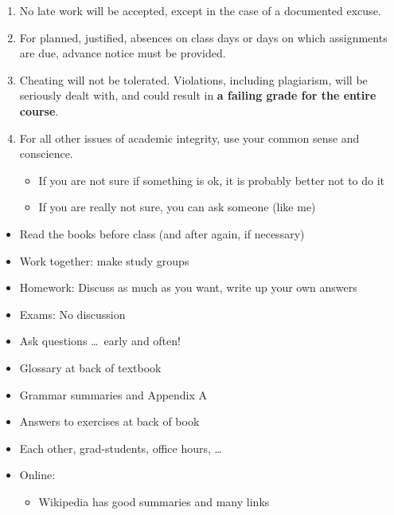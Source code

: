 \documentclass[a4paper,landscape,headrule,footrule]{foils}
\begin{document}
\begin{enumerate}
\item No late work will be accepted, except in the case of a documented excuse.
\item For planned, justified, absences on class days or days on which assignments are due, advance notice must be provided.
\item Cheating will not be tolerated. Violations, including plagiarism, will be seriously dealt with, and could result in \textbf{a failing grade for the entire course}.
\item For all other issues of academic integrity, use your common sense and conscience.
  \begin{itemize}
  \item If you are not sure if something is ok, it is probably better not to do it
  \item If you are really not sure, you can ask someone (like me)
  \end{itemize}
\end{enumerate}



\begin{itemize}
\item Read the books before class (and after again, if necessary)
\item Work together: make study groups
\item Homework: Discuss as much as you want, write up your own answers
\item Exams: No discussion
\item Ask questions \ldots\   early and often!
\end{itemize}

\begin{itemize}
\item Glossary at back of textbook
\item Grammar summaries and Appendix A
\item Answers to exercises at back of book
\item Each other, grad-students,  office hours, \ldots
\item Online:
  \begin{itemize}
  \item Wikipedia has good summaries and many links
  \end{itemize}
\end{itemize}
\end{document}
